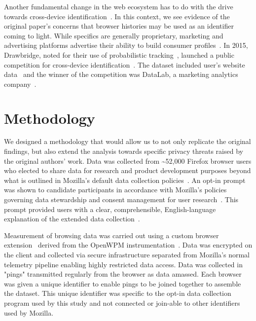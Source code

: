 \documentclass[letterpaper,twocolumn,10pt]{article}
\begin{document}
Another fundamental change in the web ecosystem has to do with the drive towards cross-device identification~\cite{brookmanCrossDeviceTrackingMeasurement2017,biltonCrossdeviceTrackingExplained2015}.
In this context, we see evidence of the original paper's concerns that browser histories may be used as an identifier coming to light.
While specifics are generally proprietary, marketing and advertising platforms advertise their ability to build consumer profiles~\cite{NewFaceofDataDrivenMarketingBuyersGuideEBPdf,OmnichannelIdentityGraphs,WhatCustomerData2019}. 
In 2015, Drawbridge, noted for their use of probabilistic tracking~\cite{biltonCrossdeviceTrackingExplained2015}, launched a public competition for cross-device identification~\cite{ICDM2015Drawbridge}. The dataset included user's website data~\cite{diaz-moralesCrossDeviceTrackingMatching2015} and the winner of the competition was DataLab, a marketing analytics company~\cite{1stPlaceFinish}.
%
\section{Methodology}
\label{sec:methods}
We designed a methodology that would allow us to not only replicate the original findings, but also extend the analysis towards specific privacy threats raised by the original authors' work.
Data was collected from \textasciitilde{52,000} Firefox browser users who elected to share data for research and product development purposes beyond what is outlined in Mozilla's default data collection policies~\cite{mozillaMozillaPrivacyPolicy2018}. 
An opt-in prompt was shown to candidate participants in accordance with Mozilla's policies governing data stewardship and consent management for user research~\cite{FirefoxDataCollection}. 
This prompt provided users with a clear, comprehensible, English-language explanation of the extended data collection~\cite{pioneer-enrollment-landing-page}.

Measurement of browsing data was carried out using a custom browser extension~\cite{jestr-addon-repo} derived from the OpenWPM instrumentation~\cite{Englehardt:2016:OTM:2976749.2978313}. 
Data was encrypted on the client and collected via secure infrastructure separated from Mozilla's normal telemetry pipeline enabling highly restricted data access. 
Data was collected in "pings" transmitted regularly from the browser as data amassed.
Each browser was given a unique identifier to enable pings to be joined together to assemble the dataset.
This unique identifier was specific to the opt-in data collection program used by this study and not connected or join-able to other identifiers used by Mozilla.
\end{document}
